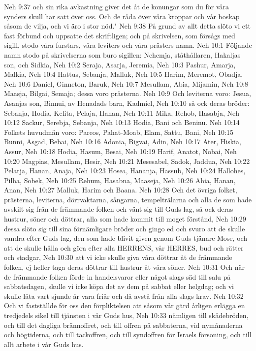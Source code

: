 Neh 9:37  och sin rika avkastning giver det åt de konungar som du för våra synders skull har satt över oss. Och de råda över våra kroppar och vår boskap såsom de vilja, och vi äro i stor nöd."
Neh 9:38  På grund av allt detta slöto vi ett fast förbund och uppsatte det skriftligen; och på skrivelsen, som försågs med sigill, stodo våra furstars, våra leviters och våra prästers namn.
Neh 10:1  Följande namn stodo på skrivelserna som buro sigillen: Nehemja, ståthållaren, Hakaljas son, och Sidkia,
Neh 10:2  Seraja, Asarja, Jeremia,
Neh 10:3  Pashur, Amarja, Malkia,
Neh 10:4  Hattus, Sebanja, Malluk,
Neh 10:5  Harim, Meremot, Obadja,
Neh 10:6  Daniel, Ginneton, Baruk,
Neh 10:7  Mesullam, Abia, Mijamin,
Neh 10:8  Maasja, Bilgai, Semaja; dessa voro prästerna.
Neh 10:9  Och leviterna voro: Jesua, Asanjas son, Binnui, av Henadads barn, Kadmiel,
Neh 10:10  så ock deras bröder: Sebanja, Hodia, Kelita, Pelaja, Hanan,
Neh 10:11  Mika, Rehob, Hasabja,
Neh 10:12  Sackur, Serebja, Sebanja,
Neh 10:13  Hodia, Bani och Beninu.
Neh 10:14  Folkets huvudmän voro: Pareos, Pahat-Moab, Elam, Sattu, Bani,
Neh 10:15  Bunni, Asgad, Bebai,
Neh 10:16  Adonia, Bigvai, Adin,
Neh 10:17  Ater, Hiskia, Assur,
Neh 10:18  Hodia, Hasum, Besai,
Neh 10:19  Harif, Anatot, Nobai,
Neh 10:20  Magpias, Mesullam, Hesir,
Neh 10:21  Mesesabel, Sadok, Jaddua,
Neh 10:22  Pelatja, Hanan, Anaja,
Neh 10:23  Hosea, Hananja, Hassub,
Neh 10:24  Hallohes, Pilha, Sobek,
Neh 10:25  Rehum, Hasabna, Maaseja,
Neh 10:26  Ahia, Hanan, Anan,
Neh 10:27  Malluk, Harim och Baana.
Neh 10:28  Och det övriga folket, prästerna, leviterna, dörrvaktarna, sångarna, tempelträlarna och alla de som hade avskilt sig från de främmande folken och vänt sig till Guds lag, så ock deras hustrur, söner och döttrar, alla som hade kommit till moget förstånd,
Neh 10:29  dessa slöto sig till sina förnämligare bröder och gingo ed och svuro att de skulle vandra efter Guds lag, den som hade blivit given genom Guds tjänare Mose, och att de skulle hålla och göra efter alla HERRENS, vår HERRES, bud och rätter och stadgar,
Neh 10:30  att vi icke skulle giva våra döttrar åt de främmande folken, ej heller taga deras döttrar till hustrur åt våra söner.
Neh 10:31  Och när de främmande folken förde in handelsvaror eller något slags säd till salu på sabbatsdagen, skulle vi icke köpa det av dem på sabbat eller helgdag; och vi skulle låta vart sjunde år vara friår och då avstå från alla slags krav.
Neh 10:32  Och vi fastställde för oss den förpliktelsen att såsom vår gärd årligen erlägga en tredjedels sikel till tjänsten i vår Guds hus,
Neh 10:33  nämligen till skådebröden, och till det dagliga brännoffret, och till offren på sabbaterna, vid nymånaderna och högtiderna, och till tackoffren, och till syndoffren för Israels försoning, och till allt arbete i vår Guds hus.
